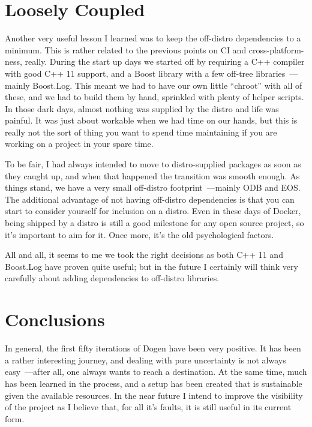 \documentclass{book}
\begin{document}
\section{Loosely Coupled}

Another very useful lesson I learned was to keep the off-distro
dependencies to a minimum. This is rather related to the previous
points on CI and cross-platform-ness, really. During the start up days
we started off by requiring a C++ compiler with good C++ 11 support,
and a Boost library with a few off-tree libraries~---mainly
Boost.Log. This meant we had to have our own little ``chroot'' with
all of these, and we had to build them by hand, sprinkled with plenty
of helper scripts. In those dark days, almost nothing was supplied by
the distro and life was painful. It was just about workable when we
had time on our hands, but this is really not the sort of thing you
want to spend time maintaining if you are working on a project in your
spare time.

To be fair, I had always intended to move to distro-supplied packages
as soon as they caught up, and when that happened the transition was
smooth enough. As things stand, we have a very small off-distro
footprint~---mainly ODB and EOS. The additional advantage of not having
off-distro dependencies is that you can start to consider yourself for
inclusion on a distro. Even in these days of Docker, being shipped by
a distro is still a good milestone for any open source project, so
it's important to aim for it. Once more, it's the old psychological
factors.

All and all, it seems to me we took the right decisions as both C++ 11
and Boost.Log have proven quite useful; but in the future I certainly
will think very carefully about adding dependencies to off-distro
libraries.

\section{Conclusions}

In general, the first fifty iterations of Dogen have been very
positive. It has been a rather interesting journey, and dealing with
pure uncertainty is not always easy~---after all, one always wants to
reach a destination. At the same time, much has been learned in the
process, and a setup has been created that is sustainable given the
available resources. In the near future I intend to improve the
visibility of the project as I believe that, for all it's faults, it
is still useful in its current form.
\end{document}

